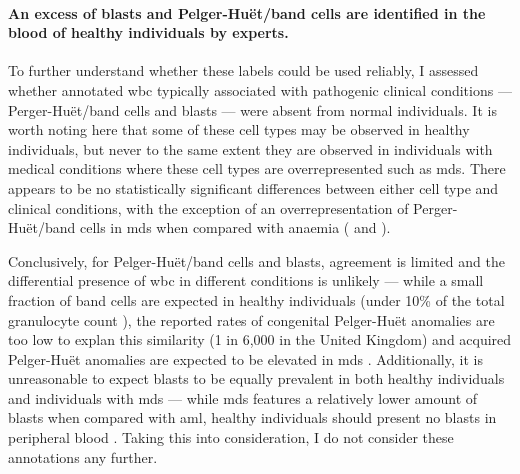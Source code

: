 \begin{figure}[!ht]
    \label{fig:mile-vice-annotated-cells-wbc-concordance-heatmap}
\end{figure}

\paragraph{An excess of blasts and Pelger-Huët/band cells are identified in the blood of healthy individuals by experts.} To further understand whether these labels could be used reliably, I assessed whether annotated \ac{wbc} typically associated with pathogenic clinical conditions --- Perger-Huët/band cells and blasts --- were absent from normal individuals. It is worth noting here that some of these cell types may be observed in healthy individuals, but never to the same extent they are observed in individuals with medical conditions where these cell types are overrepresented such as \ac{mds}. There appears to be no statistically significant differences between either cell type and clinical conditions, with the exception of an overrepresentation of Perger-Huët/band cells in \ac{mds} when compared with anaemia ( and ). 

\begin{figure}[!ht]
    \label{fig:annotated-wbc-rate}
\end{figure}

\begin{figure}[!ht]
    \label{fig:annotated-wbc-rate-test}
\end{figure}

Conclusively, for Pelger-Huët/band cells and blasts, agreement is limited and the differential presence of \ac{wbc} in different conditions is unlikely --- while a small fraction of band cells are expected in healthy individuals (under 10\% of the total granulocyte count \cite{Drees2012-sz}), the reported rates of congenital Pelger-Huët anomalies are too low to explan this similarity (1 in 6,000 in the United Kingdom) and acquired Pelger-Huët anomalies are expected to be elevated in \ac{mds} \cite{Colella2012-so}. Additionally, it is unreasonable to expect blasts to be equally prevalent in both healthy individuals and individuals with \ac{mds} --- while \ac{mds} features a relatively lower amount of blasts when compared with \ac{aml}, healthy individuals should present no blasts in peripheral blood \cite{Aster2020-cu}. Taking this into consideration, I do not consider these annotations any further.

